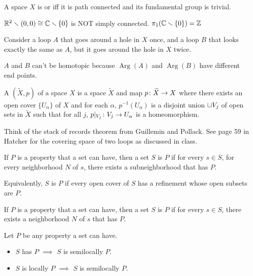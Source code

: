 \documentclass[11pt,leqno,oneside]{amsart}
\numberwithin{thm}{section}
\newcommand{\minus}{\smallsetminus}
\newcommand{\fund}[1][1]{\pi_{#1}}
\newcommand{\Arg}{\operatorname{Arg}}
\begin{document}
\begin{defn} %
  A space $X$ is  or  iff it is path connected and its
  fundamental group is trivial.
\end{defn}
\begin{example}
  $\R^2 \minus (0,0) \isom \C \minus \{0\}$ is NOT simply connected.
  $\fund(\C \minus \{0\}) = \Z$
\end{example}
\begin{example}
  Consider a loop $A$ that goes around a hole in $X$ once, and a loop $B$ that looks exactly the same as $A$, but it goes around the hole in $X$ twice.

  $A$ and $B$ can't be homotopic because $\Arg(A)$ and $\Arg(B)$ have
  different end points.
\end{example}

\begin{defn}
  A  \((\widetilde{X},p)\) of a space \(X\) is a space \(\widetilde{X}\)
  and map \(p \colon \widetilde{X} \to X\) where there exists an open cover
  \(\{U_\alpha\}\) of \(X\) and for each $\alpha$, \(p^{-1}(U_\alpha)\) is a
  disjoint union $\sqcup V_j$ of open sets in \(\widetilde{X}\) such that for all $j$, $p|_{V_j} \colon V_j \to U_\alpha$ is a homeomorphism.
\end{defn}

Think of the stack of records theorem from Guillemin and Pollack. See
page 59 in Hatcher for the covering space of two loops as discussed in
class.

\begin{defn}
  If $P$ is a property that a set can have, then a set $S$ is  $P$ if for every $s \in S$, for every neighborhood $N$ of $s$, there exists a subneighborhood that has $P$.

  Equivalently, $S$ is  $P$ if every open cover of $S$ has a refinement whose open subsets are $P$.
\end{defn}
\begin{defn}
  If $P$ is a property that a set can have, then a set $S$ is  $P$ if for every $s \in S$, there exists a neighborhood $N$ of $s$ that has $P$.
\end{defn}
\begin{prop}
  Let $P$ be any property a set can have.
  \begin{itemize}
    \item $S$ has $P$ $\implies$ $S$ is semilocally $P$.
    \item $S$ is locally $P$ $\implies$ $S$ is semilocally $P$.
  \end{itemize}
\end{prop}
\end{document}
